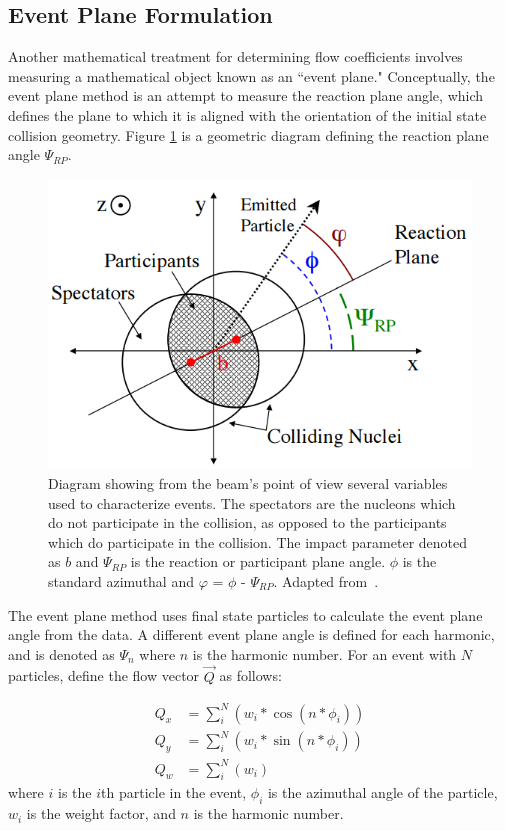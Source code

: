 \subsection{Event Plane Formulation}
\label{sec:event_plane}
Another mathematical treatment for determining flow coefficients involves measuring a mathematical object known as an ``event plane." Conceptually, the event plane method is an attempt to measure the reaction plane angle, which defines the plane to which it is aligned with the orientation of the initial state collision geometry. Figure \ref{fig:reaction_plane_diagram} is a geometric diagram defining the reaction plane angle $\Psi_{RP}$.

\begin{figure}[!ht]
\begin{center}
\includegraphics[width=0.68\linewidth]{figs/reaction_plane_diagram.PNG}%
\caption{Diagram showing from the beam’s point of view several variables used to characterize events. The spectators are the nucleons which do not participate in the collision, as opposed to the participants which do participate in the collision. The impact parameter denoted as $b$ and $\Psi_{RP}$ is the reaction or participant plane angle. $\phi$ is the standard azimuthal and $\varphi$ = $\phi$ - $\Psi_{RP}$. Adapted from~\cite{Richardson:2012pka}.}
\label{fig:reaction_plane_diagram}
\end{center}
\end{figure}

The event plane method uses final state particles to calculate the event plane angle from the data. A different event plane angle is defined for each harmonic, and is denoted as $\Psi_n$ where $n$ is the harmonic number. For an event with $N$ particles, define the flow vector $\vec{Q}$ as follows:

\begin{align}
Q_x &= \sum_i^{N}( w_i * \cos(n * \phi_i)) \\
Q_y &= \sum_i^{N}( w_i * \sin(n * \phi_i)) \\
Q_w &= \sum_i^{N}( w_i )
\label{eqn:general_ep_math}
\end{align}
where $i$ is the $i$th particle in the event, $\phi_i$ is the azimuthal angle of the particle, $w_i$ is the weight factor, and $n$ is the harmonic number.

